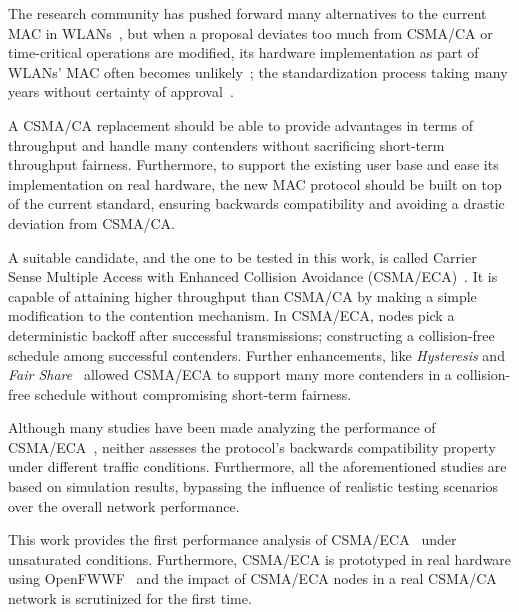 \documentclass[a4paper,journal]{IEEEtran}
\begin{document}
The research community has pushed forward many alternatives to the current MAC in WLANs~\cite{bharghavan1994map,wang2004ncr,cali2000dti,lopez-toledo2006aoi,
barcelo2008lba,bellalta2009vtc,HE,CSMA_ECA,L_MAC2,hui2011epp,barcelo2011tcf}, but when a proposal deviates too much from CSMA/CA or time-critical operations are modified, its hardware implementation as part of WLANs' MAC often becomes unlikely~\cite{WMP}; the standardization process taking many years without certainty of approval~\cite{perahia2008ieee}. 


A CSMA/CA replacement should be able to provide advantages in terms of throughput and handle many contenders without sacrificing short-term throughput fairness. Furthermore, to support the existing user base and ease its implementation on real hardware, the new MAC protocol should be built on top of the current standard, ensuring backwards compatibility and avoiding a drastic deviation from CSMA/CA.


A suitable candidate, and the one to be tested in this work, is called Carrier Sense Multiple Access with Enhanced Collision Avoidance (CSMA/ECA)~\cite{barcelo2008lba}. It is capable of attaining higher throughput than CSMA/CA by making a simple modification to the contention mechanism. In CSMA/ECA, nodes pick a deterministic backoff after successful transmissions; constructing a collision-free schedule among successful contenders. Further enhancements, like \emph{Hysteresis} and \emph{Fair Share}~\cite{research2standards} allowed CSMA/ECA to support many more contenders in a collision-free schedule without compromising short-term fairness.

Although many studies have been made analyzing the performance of CSMA/ECA~\cite{barcelo2008lba,research2standards,bellalta2009vtc,E2CA_performance}, neither assesses the protocol's backwards compatibility property under different traffic conditions. Furthermore, all the aforementioned studies are based on simulation results, bypassing the influence of realistic testing scenarios over the overall network performance.

This work provides the first performance analysis of CSMA/ECA~\cite{research2standards} under unsaturated conditions. Furthermore, CSMA/ECA is prototyped in real hardware using OpenFWWF~\cite{OpenFWWF} and the impact of CSMA/ECA nodes in a real CSMA/CA network is scrutinized for the first time.
\end{document}
